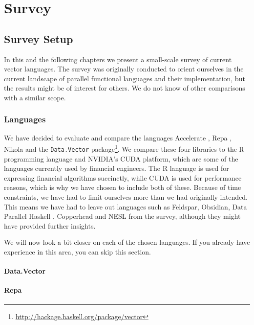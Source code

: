 \part{Survey}
\chapter{Survey Setup}
In this and the following chapters we present a small-scale survey of
current vector languages. The survey was originally conducted to
orient ourselves in the current landscape of parallel functional
languages and their implementation, but the results might be of
interest for others. We do not know of other comparisons with a
similar scope.

\section{Languages}
We have decided to evaluate and compare the languages Accelerate
\cite{chakravarty2011accelerating}, Repa \cite{keller2010regular},
Nikola \cite{mainland2010nikola} and the \texttt{Data.Vector}
package\footnote{\url{http://hackage.haskell.org/package/vector}}. We
compare these four libraries to the R programming language and NVIDIA's
CUDA platform, which are some of the languages currently used by
financial engineers. The R language is used for expressing financial
algorithms succinctly, while CUDA is used for performance reasons,
which is why we have chosen to include both of these. Because of time
constraints, we have had to limit ourselves more than we had originally
intended. This means we have had to leave out languages such as
Feldspar\cite{axelsson2010feldspar},
Obsidian\cite{svensson2011obsidian}, Data Parallel Haskell \cite{},
Copperhead\cite{Catanzaro2011} and NESL\cite{nesl} from the survey,
although they might have provided further insights.


We will now look a bit closer on each of the chosen languages. If you
already have experience in this area, you can skip this section.

\subsection{Data.Vector}

\subsection{Repa}

